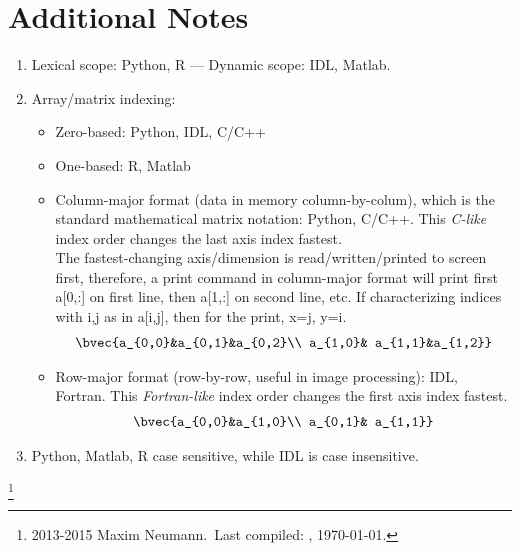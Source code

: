 \documentclass[10pt]{article}
\begin{document}
\section*{Additional Notes}
\begin{enumerate}
\item Lexical scope: Python, R --- Dynamic scope: IDL, Matlab.
\item Array/matrix indexing:
  \begin{itemize}
  \item Zero-based: Python, IDL, C/C++
  \item One-based: R, Matlab
  \item Column-major format (data in memory column-by-colum), which is
    the standard mathematical matrix notation: Python, C/C++.  This
    \emph{C-like} index order changes the last axis index fastest.\\
    The fastest-changing axis/dimension is read/written/printed to
    screen first, therefore, a print command in column-major format
    will print first a[0,:] on first line, then a[1,:] on second line,
    etc. If characterizing indices with i,j as in a[i,j], then for the
    print, x=j, y=i.
    \begin{align}
      \bvec{a_{0,0}&a_{0,1}&a_{0,2}\\
        a_{1,0}& a_{1,1}&a_{1,2}}
    \end{align}
  \item Row-major format (row-by-row, useful in image processing):
    IDL, Fortran. This \emph{Fortran-like} index order changes the
    first axis index fastest.
    \begin{align}
      \bvec{a_{0,0}&a_{1,0}\\
        a_{0,1}& a_{1,1}}
    \end{align}
  \end{itemize}
\item Python, Matlab, R case sensitive, while IDL is case insensitive.
\end{enumerate}


\fi



\let\thefootnote\relax\footnote{2013-2015 Maxim Neumann.\ Last compiled: \small \currenttime, \today.}


\end{document}
